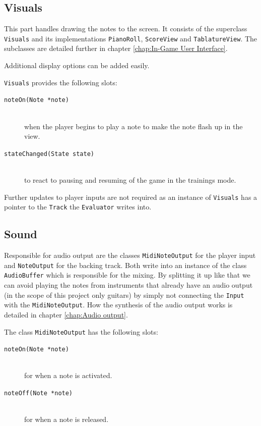 \subsection{Visuals}
This part handles drawing the notes to the screen. It consists of the superclass {\tt Visuals} and its implementations {\tt PianoRoll}, {\tt ScoreView} and {\tt TablatureView}. The subclasses are detailed further in chapter \ref{chap:In-Game User Interface}. 

Additional display options can be added easily.

{\tt Visuals} provides the following slots:
\begin{description}
	\item[{\tt noteOn(Note *note)}] \hfil \\ when the player begins to play a note to make the note flash up in the view.
	\item[{\tt stateChanged(State state)}] \hfil \\ to react to pausing and resuming of the game in the trainings mode.
\end{description}

Further updates to player inputs are not required as an instance of {\tt Visuals} has a pointer to the {\tt Track} the {\tt Evaluator} writes into.

\subsection{Sound}
Responsible for audio output are the classes {\tt MidiNoteOutput} for the player input and {\tt NoteOutput} for the backing track. Both write into an instance of the class {\tt AudioBuffer} which is responsible for the mixing. By splitting it up like that we can avoid playing the notes from instruments that already have an audio output (in the scope of this project only guitars) by simply not connecting the {\tt Input} with the {\tt MidiNoteOutput}. How the synthesis of the audio output works is detailed in chapter \ref{chap:Audio output}.

The class {\tt MidiNoteOutput} has the following slots:
\begin{description}
	\item[{\tt noteOn(Note *note)}] \hfil \\ for when a note is activated.
	\item[{\tt noteOff(Note *note)}] \hfil \\ for when a note is released.
\end{description}

